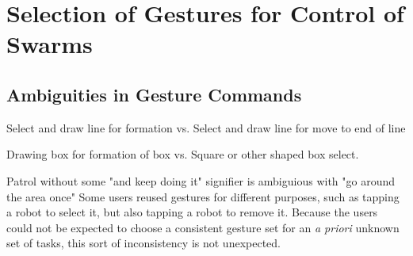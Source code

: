 \chapter{Selection of Gestures for Control of Swarms}


\section{Ambiguities in Gesture Commands}

Select and draw line for formation vs. Select and draw line for move to end of line

Drawing box for formation of box vs. Square or other shaped box select.

 Patrol without some "and keep doing it" signifier is ambiguious with "go around the area once"
Some users reused gestures for different purposes, such as tapping a robot to select it, but also tapping a robot to remove it.
Because the users could not be expected to choose a consistent gesture set for an \emph{a priori} unknown set of tasks, this sort of inconsistency is not unexpected. 

